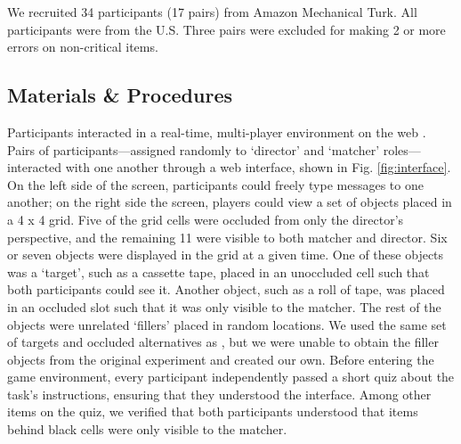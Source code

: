 \documentclass[10pt,letterpaper]{article}
\begin{document}
We recruited 34 participants (17 pairs) from Amazon Mechanical Turk. All participants were from the U.S. Three pairs were excluded for making 2 or more errors on non-critical items.

\subsection{Materials \& Procedures}


Participants interacted in a real-time, multi-player environment on the web \cite{Hawkins15_RealTimeWebExperiments}. 
Pairs of participants---assigned randomly to `director' and `matcher' roles---interacted with one another through a web interface, shown in Fig. \ref{fig:interface}. On the left side of the screen, participants could freely type messages to one another; on the right side the screen, players could view a set of objects placed in a 4 x 4 grid. Five of the grid cells were occluded from only the director's perspective, and the remaining 11 were visible to both matcher and director. Six or seven objects were displayed in the grid at a given time. One of these objects was a `target', such as a cassette tape, placed in an unoccluded cell such that both participants could see it. Another object, such as a roll of tape, was placed in an occluded slot such that it was only visible to the matcher. The rest of the objects were unrelated `fillers' placed in random locations. We used the same set of targets and occluded alternatives as , but we were unable to obtain the filler objects from the original experiment and created our own.
Before entering the game environment, every participant independently passed a short quiz about the task's instructions, ensuring that they understood the interface. Among other items on the quiz, we verified that both participants understood that items behind black cells were only visible to the matcher. 
\end{document}
